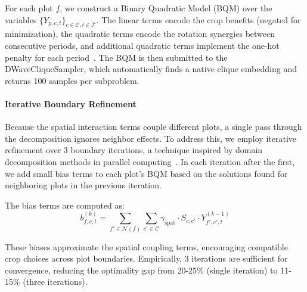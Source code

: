 \documentclass{oqireport}
\begin{document}
For each plot $f$, we construct a Binary Quadratic Model (BQM) over the variables $\{Y_{p,c,t}\}_{c \in \mathcal{C}, t \in \mathcal{T}}$. The linear terms encode the crop benefits (negated for minimization), the quadratic terms encode the rotation synergies between consecutive periods, and additional quadratic terms implement the one-hot penalty for each period~\cite{lucas2014ising}. The BQM is then submitted to the DWaveCliqueSampler, which automatically finds a native clique embedding and returns 100 samples per subproblem.

\paragraph{Iterative Boundary Refinement}

Because the spatial interaction terms couple different plots, a single pass through the decomposition ignores neighbor effects. To address this, we employ iterative refinement over 3 boundary iterations, a technique inspired by domain decomposition methods in parallel computing~\cite{toselli2005domain}. In each iteration after the first, we add small bias terms to each plot's BQM based on the solutions found for neighboring plots in the previous iteration. 

The bias terms are computed as:
\begin{equation}
b_{f,c,t}^{(k)} = \sum_{f' \in \mathcal{N}(f)} \sum_{c' \in \mathcal{C}} \gamma_{\text{spat}} \cdot S_{c,c'} \cdot Y_{f',c',t}^{(k-1)}
\end{equation}

These biases approximate the spatial coupling terms, encouraging compatible crop choices across plot boundaries. Empirically, 3 iterations are sufficient for convergence, reducing the optimality gap from 20-25\% (single iteration) to 11-15\% (three iterations).
\end{document}
